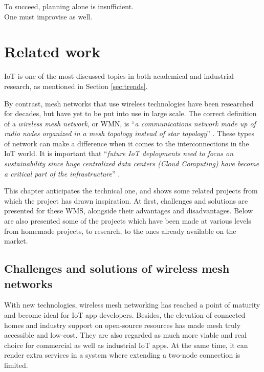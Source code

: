 
\begin{savequote}[70mm]
	To succeed, planning alone is insufficient.\\One must improvise as well.
\end{savequote}

\chapter{Related work}\label{chapter:related_work}

	IoT is one of the most discussed topics in both academical and industrial research, as mentioned in Section \ref{sec:trends}.
	
	By contrast, mesh networks that use wireless technologies have been researched for decades, but have yet to be put into use in large scale.
	The correct definition of a \textit{wireless mesh network}, or WMN, is ``\textit{a communications network made up of radio nodes organized in a mesh topology instead of star topology}'' \cite{wms}.
	These types of network can make a difference when it comes to the interconnections in the IoT world.
	It is important that ``\textit{future IoT deployments need to focus on sustainability since huge centralized data centers (Cloud Computing) have become a critical part of the infrastructure}'' \cite{7968828}.
	
	This chapter anticipates the technical one, and shows some related projects from which the project has drawn inspiration.
	At first, challenges and solutions are presented for these WMS, alongside their advantages and disadvantages.
	Below are also presented some of the projects which have been made at various levels from homemade projects, to research, to the ones already available on the market.
	
	
	\section{Challenges and solutions of wireless mesh networks}
		
		
		With new technologies, wireless mesh networking has reached a point of maturity and become ideal for IoT app developers. Besides, the elevation of connected homes and industry support on open-source resources has made mesh truly accessible and low-cost. They are also regarded as much more viable and real choice for commercial as well as industrial IoT apps. At the same time, it can render extra services in a system where extending a two-node connection is limited.
		
